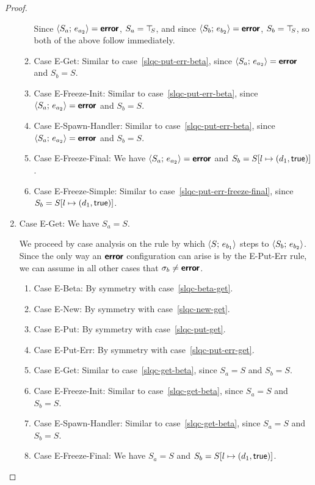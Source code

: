\begin{proof}
\begin{enumerate}
\begin{enumerate}
      Since $\langle S_a;\, e_{a_2} \rangle = \textbf{\textsf{error}}$, $S_a = \top\hspace{-0.85mm}_{S}$, and since
      $\langle S_b;\, e_{b_2} \rangle = \textbf{\textsf{error}}$, $S_b = \top\hspace{-0.85mm}_{S}$, so both of the
      above follow immediately.

    \item \label{slqc-put-err-get}Case {\sc E-Get}: Similar to
      case~\ref{slqc-put-err-beta}, since $\langle S_a;\, e_{a_2} \rangle =
      \textbf{\textsf{error}}$ and $S_b = S$.
    \item \label{slqc-put-err-freeze-init}Case {\sc E-Freeze-Init}:
      Similar to case~\ref{slqc-put-err-beta}, since
      $\langle S_a;\, e_{a_2} \rangle = \textbf{\textsf{error}}$ and $S_b = S$.
    \item \label{slqc-put-err-spawn-handler}Case {\sc
      E-Spawn-Handler}: Similar to case~\ref{slqc-put-err-beta}, since
      $\langle S_a;\, e_{a_2} \rangle = \textbf{\textsf{error}}$ and $S_b = S$.
    \item \label{slqc-put-err-freeze-final}Case {\sc E-Freeze-Final}:
      We have $\langle S_a;\, e_{a_2} \rangle = \textbf{\textsf{error}}$ and $S_b =
      S[l \mapsto (d_1, \textsf{true})]$.

      \TODO{}
    \item \label{slqc-put-err-freeze-simple}Case {\sc
      E-Freeze-Simple}: Similar to
      case~\ref{slqc-put-err-freeze-final}, since $S_b =
      S[l \mapsto (d_1, \textsf{true})]$.

    \end{enumerate}
  \item Case {\sc E-Get}: We have $S_a = S$.

    We proceed by case analysis on the rule by which
    $\langle S;\, e_{b_1} \rangle$ steps to $\langle S_b;\, e_{b_2} \rangle$.  Since the
    only way an $\textbf{\textsf{error}}$ configuration can arise is by the {\sc
      E-Put-Err} rule, we can assume in all other cases that $\sigma_b
    \neq \textbf{\textsf{error}}$.
    \begin{enumerate}
    \item \label{slqc-get-beta}Case {\sc E-Beta}: By symmetry with case~\ref{slqc-beta-get}.
    \item \label{slqc-get-new}Case {\sc E-New}: By symmetry with case~\ref{slqc-new-get}.
    \item \label{slqc-get-put}Case {\sc E-Put}: By symmetry with case~\ref{slqc-put-get}.
    \item \label{slqc-get-put-err}Case {\sc E-Put-Err}: By symmetry with case~\ref{slqc-put-err-get}.
    \item \label{slqc-get-get}Case {\sc E-Get}: Similar to
      case~\ref{slqc-get-beta}, since $S_a = S$ and $S_b = S$.
    \item \label{slqc-get-freeze-init}Case {\sc E-Freeze-Init}:
      Similar to case~\ref{slqc-get-beta}, since $S_a = S$ and $S_b = S$.
    \item \label{slqc-get-spawn-handler}Case {\sc E-Spawn-Handler}:
      Similar to case~\ref{slqc-get-beta}, since $S_a = S$ and $S_b = S$.
    \item \label{slqc-get-freeze-final}Case {\sc E-Freeze-Final}: We
      have $S_a = S$ and $S_b = S[l \mapsto (d_1, \textsf{true})]$.


\end{enumerate}
\end{enumerate}
\end{proof}
